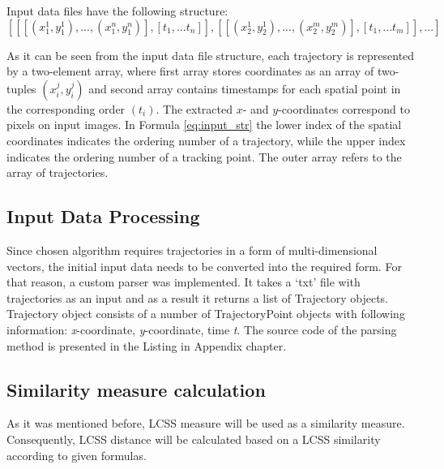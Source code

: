 Input data files have the following structure:
\begin{equation} \label{eq:input_str}
	[[[(x_1^1, y_1^1), ..., (x_1^n, y_1^n)], [t_1, ... t_n]], [[(x_2^1, y_2^1), ..., (x_2^m, y_2^m)], [t_1, ... t_m]], ...]
\end{equation}

As it can be seen from the input data file structure, each trajectory is represented by a two-element array, where first array stores coordinates as an array of two-tuples $(x_i^j, y_i^j)$ and second array contains timestamps for each spatial point in the corresponding order $(t_i)$. The extracted $x$- and $y$-coordinates correspond to pixels on input images. In Formula \ref{eq:input_str} the lower index of the spatial coordinates indicates the ordering number of a trajectory, while the upper index indicates the ordering number of a tracking point. The outer array refers to the array of trajectories.

\subsection{Input Data Processing}
Since chosen algorithm requires trajectories in a form of multi-dimensional vectors, the initial input data needs to be converted into the required form. For that reason, a custom parser was implemented. It takes a ‘txt’ file with trajectories as an input and as a result it returns a list of Trajectory objects. Trajectory object consists of a number of TrajectoryPoint objects with following information: \textit{x}-coordinate, \textit{y}-coordinate, time \textit{t}. The source code of the parsing method is presented in the Listing in Appendix chapter.

\subsection{Similarity measure calculation}

As it was mentioned before, LCSS measure will be used as a similarity measure. Consequently, LCSS distance will be calculated based on a LCSS similarity according to given formulas. 

\lstset{style=code-style}


